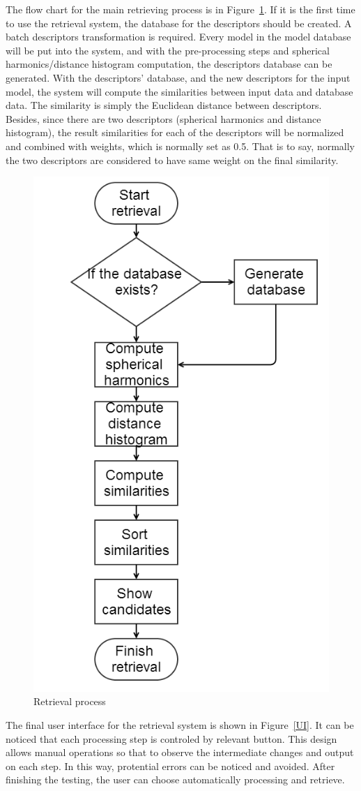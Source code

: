 The flow chart for the main retrieving process is in Figure~\ref{scan2search_main}. If it is the first time to use the retrieval system, the database for the descriptors should be created. A batch descriptors transformation is required. Every model in the model database will be put into the system, and with the pre-processing steps and spherical harmonics/distance histogram computation, the descriptors database can be generated. With the descriptors' database, and the new descriptors for the input model, the system will compute the similarities between input data and database data. The similarity is simply the Euclidean distance between
descriptors. Besides, since there are two descriptors (spherical harmonics and distance histogram), the result similarities for each of the descriptors will be normalized and combined with weights, which is normally set as 0.5. That is to say, normally the two descriptors are considered to have same weight on the final similarity.

\begin{figure}[h]
\centering
\includegraphics[width=0.4\linewidth]{scan2search_main}
\caption{Retrieval process} \label{scan2search_main}
\end{figure}

The final user interface for the retrieval system is shown in Figure~\ref{UI}. It can be noticed that each processing step is controled by relevant button. This design allows manual operations so that to observe the intermediate changes and output on each step. In this way, protential errors can be noticed and avoided. After finishing the testing, the user can choose automatically processing and retrieve.

